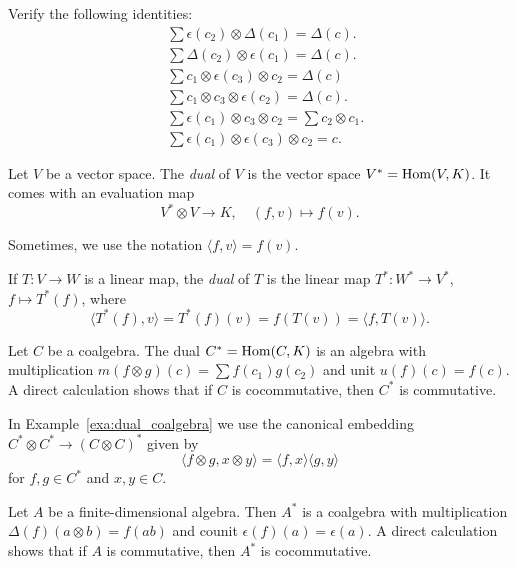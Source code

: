 \documentclass[12pt]{amsproc}
\begin{document}
\begin{exercise}
\label{xca:Sweedler}
    Verify the following identities:
    \begin{align}
        &\sum\epsilon(c_{2})\otimes \Delta(c_{1})
        =\Delta(c).\\
        &\sum\Delta(c_{2})\otimes \epsilon(c_{1})=\Delta(c).\\
        &\sum c_{1}\otimes\epsilon (c_{3})\otimes c_{2}=\Delta(c)\\
        &
        \sum c_{1}\otimes c_{3}\otimes \epsilon (c_{2})=\Delta(c).\\
        &\sum \epsilon(c_{1})\otimes c_{3}\otimes c_{2}=
        \sum c_{2}\otimes c_{1}.\\
        &\sum \epsilon(c_{1})\otimes\epsilon(c_{3})\otimes c_{2}=c.
    \end{align}
\end{exercise}

Let $V$ be a vector space. The \emph{dual} of $V$ 
is the vector space $V^*=\operatorname{Hom}(V,K)$. It comes with 
an evaluation map
\[
V^*\otimes V\to K,\quad 
(f,v)\mapsto f(v).
\]

Sometimes, we use the notation $\langle f,v\rangle=f(v)$. 

If $T\colon V\to W$ is a linear map, 
the \emph{dual} of $T$ is the linear 
map $T^*\colon W^*\to V^*$, $f\mapsto T^*(f)$, where 
\[
\langle T^*(f),v\rangle=T^*(f)(v)=f(T(v))=\langle f,T(v)\rangle.
\]

\begin{example}
\label{exa:dual_coalgebra}
    Let $C$ be a coalgebra. The dual 
    $C^*=\operatorname{Hom}(C,K)$ is an algebra
    with multiplication 
    $m(f\otimes g)(c)=\sum f(c_1)g(c_2)$ 
    and unit $u(f)(c)=f(c)$. A direct calculation 
    shows that if $C$ is cocommutative, then $C^*$ is commutative. 
\end{example}

In Example~\ref{exa:dual_coalgebra} we use 
the canonical 
embedding $C^*\otimes C^*\to (C\otimes C)^*$ given by 
\[
\langle f\otimes g,x\otimes y\rangle
=\langle f,x\rangle\langle g,y\rangle
\]
for $f,g\in C^*$ and $x,y\in C$. 


\begin{example}
\label{exa:dual_algebra}
    Let $A$ be a finite-dimensional algebra. Then $A^*$ is 
    a coalgebra with multiplication 
    $\Delta(f)(a\otimes b)=f(ab)$ and counit 
    $\epsilon(f)(a)=\epsilon(a)$. A direct calculation shows that 
    if $A$ is commutative, then $A^*$ is cocommutative. 
\end{example}
\end{document}
